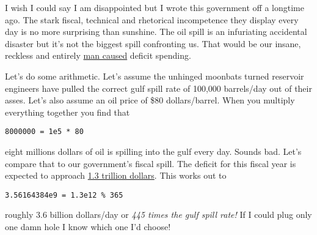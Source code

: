 I wish I could say I am disappointed but I wrote this government off a
longtime ago. The stark fiscal, technical and rhetorical incompetence
they display every day is no more surprising than sunshine. The oil
spill is an infuriating accidental disaster but it's not the biggest
spill confronting us. That would be our insane, reckless and entirely
\href{http://newsbusters.org/blogs/tim-graham/2009/03/19/obama-speak-homeland-security-secretary-replaces-terrorism-term-man-caus}{man
caused} deficit spending.

Let's do some arithmetic. Let's assume the unhinged moonbats turned
reservoir engineers have pulled the correct gulf spill rate of 100,000
barrels/day out of their asses. Let's also assume an oil price of \$80
dollars/barrel. When you multiply everything together you find that
\begin{tcolorbox}[breakable, size=fbox, boxrule=1pt, pad at break*=1mm,colback=cellbackground, colframe=cellborder]
\begin{verbatim}
8000000 = 1e5 * 80
\end{verbatim}
\end{tcolorbox}
eight millions dollars of oil is spilling into the gulf every day.
Sounds bad. Let's compare that to our government's fiscal spill. The
deficit for this fiscal year is expected to approach
\href{http://www.usdebtclock.org/}{1.3 trillion dollars}. This works out
to
\begin{tcolorbox}[breakable, size=fbox, boxrule=1pt, pad at break*=1mm,colback=cellbackground, colframe=cellborder]
\begin{verbatim}
3.56164384e9 = 1.3e12 % 365
\end{verbatim}
\end{tcolorbox}
roughly 3.6 billion dollars/day or \emph{445 times the gulf spill rate!}
If I could plug only one damn hole I know which one I'd choose!




%